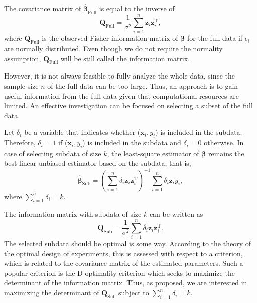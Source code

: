 \documentclass[12pt]{article}
\theoremstyle{definition}
\begin{document}
	The covariance matrix of $\hat{\boldsymbol{\beta}}_{\text{Full}}$ is equal to the inverse of
	\begin{equation*}
		\textbf{Q}_{\text{Full}}=\dfrac{1}{\sigma^2}\sum_{i=1}^{n}\textbf{z}_i\textbf{z}_i^{\text{T}},
	\end{equation*}
	where $\textbf{Q}_{\text{Full}}$ is the observed Fisher information matrix of $\boldsymbol{\beta}$ for the full data if $\epsilon_i$ are normally distributed. Even though we do not require the normality assumption, $\textbf{Q}_{\text{Full}}$ will be still called the information matrix.
	
	However, it is not always feasible to fully analyze the whole data, since the sample size $n$ of the full data can be too large. Thus, an approach is to gain useful information from the full data given that computational resources are limited. An effective investigation can be focused on selecting a subset of the full data.
	
	Let $\delta_i$ be a variable that indicates whether ($\textbf{x}_i, y_i$) is included in the subdata. Therefore, $\delta_i=1$ if ($\textbf{x}_i, y_i$) is included in the subdata and $\delta_i=0$ otherwise. In case of selecting subdata of size $k$, the least-square estimator of $\boldsymbol{\beta}$ remains the best linear unbiased estimator based on the subdata, that is, 
	\begin{equation*}
		\hat{\boldsymbol{\beta}}_{\text{Sub}}=\left(\sum_{i=1}^{n}\delta_i\textbf{z}_i\textbf{z}_i^{\text{T}}\right)^{-1}\sum_{i=1}^{n}\delta_i\textbf{z}_iy_i,
	\end{equation*}
	where $\sum_{i=1}^{n}\delta_i=k$.
	
	The information matrix with subdata of size $k$ can be written as
	\begin{equation}\label{inf_sub}
		\textbf{Q}_{\text{Sub}}=\dfrac{1}{\sigma^2}\sum_{i=1}^{n}\delta_i\textbf{z}_i\textbf{z}_i^{\text{T}}.
	\end{equation}
	The selected subdata should be optimal is some way. According to the theory of the optimal design of experiments, this is assessed with respect to a criterion, which is related to the covariance matrix of the estimated parameters. Such a popular criterion is the D-optimality criterion which seeks to maximize the determinant of the information matrix. Thus, as \cite{wang2019information} proposed, we are interested in maximizing the determinant of $\textbf{Q}_{\text{Sub}}$ subject to $\sum_{i=1}^{n}\delta_i=k$.
	
\end{document}
